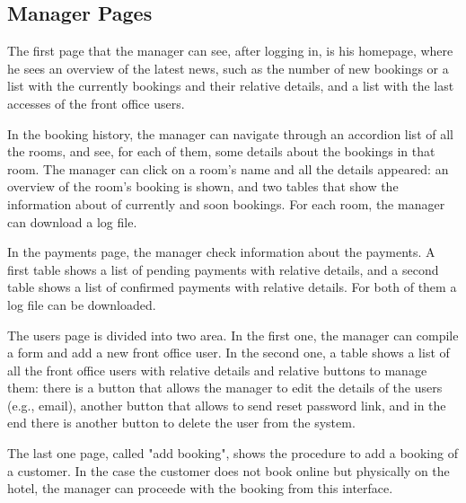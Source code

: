 \subsection{Manager Pages}
\par \noindent The first page that the manager can see, after logging in, is his homepage, where he sees an overview of the latest news, such as the number of new bookings or a list with the currently bookings and their relative details, and a list with the last accesses of the front office users.
\par \noindent In the booking history, the manager can navigate through an accordion list of all the rooms, and see, for each of them, some details about the bookings in that room. The manager can click on a room's name and all the details appeared: an overview of the room's booking is shown, and two tables that show the information about of currently and soon bookings. For each room, the manager can download a log file.
\par \noindent In the payments page, the manager check information about the payments. A first table shows a list of pending payments with relative details, and a second table shows a list of confirmed payments with relative details. For both of them a log file can be downloaded.
\par \noindent The users page is divided into two area. In the first one, the manager can compile a form and add a new front office user. In the second one, a table shows a list of all the front office users with relative details and relative buttons to manage them: there is a button that allows the manager to edit the details of the users (e.g., email), another button that allows to send reset password link, and in the end there is another button to delete the user from the system.
\par \noindent The last one page, called "add booking", shows the procedure to add a booking of a customer. In the case the customer does not book online but physically on the hotel, the manager can proceede with the booking from this interface.

